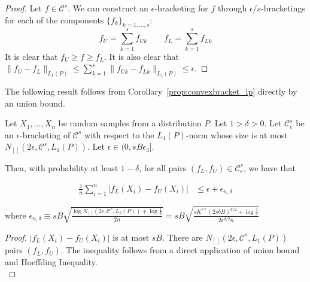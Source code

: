 \begin{proof}
Let $f \in \mathcal{C}^s$. We can construct an $\epsilon$-bracketing for $f$ through $\epsilon/s$-bracketings for each of the components $\{ f_k \}_{k=1,...,s}$:
\[f_U = \sum_{k=1}^s f_{Uk}  \qquad f_L = \sum_{k=1}^s f_{Lk} \]
It is clear that $f_U \geq f \geq f_L$. It is also clear that $\| f_U - f_L \|_{L_1(P)} \leq \sum_{k=1}^s \| f_{Uk} - f_{Lk} \|_{L_1(P)} \leq \epsilon$.
\end{proof}


The following result follows from Corollary~\ref{prop:convexbracket_lp} directly by an union bound. 

\begin{corollary}
\label{cor:convexbracket_ln}
Let $X_1,...,X_n$ be random samples from a distribution $P$. Let $1 > \delta > 0$. Let $\mathcal{C}^s_\epsilon$ be an $\epsilon$-bracketing of $\mathcal{C}^s$ with respect to the $L_1(P)$-norm whose size is at most $N_{[]}( 2\epsilon, \mathcal{C}^s, L_1(P))$. Let $\epsilon \in (0, s B \epsilon_3]$.

Then, with probability at least $1-\delta$, for all pairs $(f_L, f_U) \in \mathcal{C}^s_\epsilon$, we have that

\begin{align*}
\frac{1}{n} \sum_{i=1}^n |f_L(X_i) - f_U(X_i)| &\leq \epsilon + \epsilon_{n, \delta}
\end{align*}

where 
$\epsilon_{n,\delta} \equiv 
sB \sqrt{ \frac{ \log N_{[]}(2\epsilon, \mathcal{C}^s, L_2(P)) + \log \frac{1}{\delta}}{2n}} = 
sB \sqrt{ \frac{sK^{**} (2sbB)^{d/2} + \log \frac{1}{\delta}}{2\epsilon^{d/2} n} }$
\end{corollary}

\begin{proof}
$|f_L(X_i) - f_U(X_i)|$ is at most $sB$. There are $N_{[]}(2\epsilon, \mathcal{C}^s, L_1(P))$ pairs $(f_L, f_U)$. The inequality follows from a direct application of union bound and Hoeffding Inequality.\\
\end{proof}


